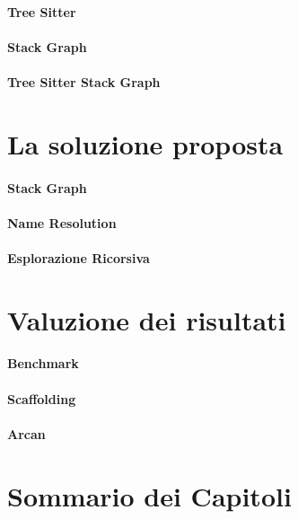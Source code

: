 \paragraph{Tree Sitter}

\paragraph{Stack Graph}

\paragraph{Tree Sitter Stack Graph}

\section{La soluzione proposta}

\paragraph{Stack Graph}

\paragraph{Name Resolution}

\paragraph{Esplorazione Ricorsiva}

\section{Valuzione dei risultati}

\paragraph{Benchmark}

\paragraph{Scaffolding}

\paragraph{Arcan}

\section{Sommario dei Capitoli}
